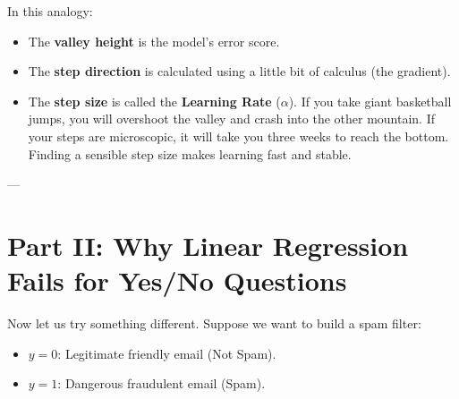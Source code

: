 \documentclass[11pt,journal,onecolumn]{IEEEtran}
\begin{document}
\vspace{0.5em}
\noindent{}
\vspace{0.5em}

In this analogy:
\begin{itemize}
    \item The \textbf{valley height} is the model's error score.
    \item The \textbf{step direction} is calculated using a little bit of calculus (the gradient).
    \item The \textbf{step size} is called the \textbf{Learning Rate} ($\alpha$). If you take giant basketball jumps, you will overshoot the valley and crash into the other mountain. If your steps are microscopic, it will take you three weeks to reach the bottom. Finding a sensible step size makes learning fast and stable.
\end{itemize}

---

\section{Part II: Why Linear Regression Fails for Yes/No Questions}

Now let us try something different. Suppose we want to build a spam filter:
\begin{itemize}
    \item $y = 0$: Legitimate friendly email (Not Spam).
    \item $y = 1$: Dangerous fraudulent email (Spam).
\end{itemize}
\end{document}
